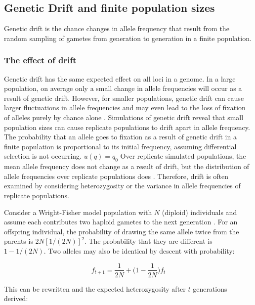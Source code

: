 \subsection{Genetic Drift and finite population sizes}
\label{sec:Gdrift}

Genetic drift is the chance changes in allele frequency that result from the random sampling of gametes from generation to generation in a finite population.

\subsubsection{The effect of drift}

Genetic drift has the same expected effect on all loci in a genome.
In a large population, on average only a small change in allele frequencies will occur as a result of genetic drift.
However, for smaller populations, genetic drift can cause larger fluctuations in allele frequencies and may even lead to the loss of fixation of alleles purely by chance alone \parencite{Hedrick2010,Charlesworth2010}.
Simulations of genetic drift reveal that small population sizes can cause replicate populations to drift apart in allele frequency.
The probability that an allele goes to fixation as a result of genetic drift in a finite population is proportional to its initial frequency, assuming differential selection is not occurring. $u(q) = q_0$
Over replicate simulated populations, the mean allele frequency does not change as a result of drift, but the distribution of allele frequencies over replicate populations does \parencite{Hedrick2010,Charlesworth2010}.
Therefore, drift is often examined by considering heterozygosity or the variance in allele frequencies of replicate populations. 

Consider a Wright-Fisher model population with $N$ (diploid) individuals and assume each contributes two haploid gametes to the next generation \parencite{Crow1970}.
For an offspring individual, the probability of drawing the same allele twice from the parents is $2N[1/(2N)]^2$.
The probability that they are different is $1-1/(2N)$.
Two alleles may also be identical by descent with probability:

\begin{equation} \label{eq:ibd}
f_{t+1} = \frac{1}{2N} + \bigg(1-\frac{1}{2N}\bigg)f_t
\end{equation}

This can be rewritten and the expected heterozygosity after $t$ generations derived:

